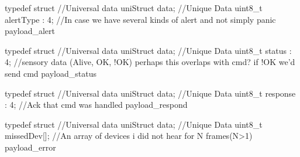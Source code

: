 typedef struct { 
    //Universal data
    uniStruct data;
    //Unique Data 
    uint8_t alertType : 4;  //In case we have several kinds of alert and not simply panic
} payload_alert

typedef struct { 
    //Universal data
    uniStruct data;
    //Unique Data 
    uint8_t status : 4;    //sensory data (Alive, OK, !OK) perhaps this overlaps with cmd? if !OK we'd send cmd 
} payload_status

typedef struct { 
    //Universal data
    uniStruct data;
    //Unique Data 
    uint8_t response : 4;  //Ack that cmd was handled
} payload_respond

typedef struct { 
    //Universal data
    uniStruct data;
    //Unique Data 
    uint8_t missedDev[];  //An array of devices i did not hear for N frames(N>1)
} payload_error